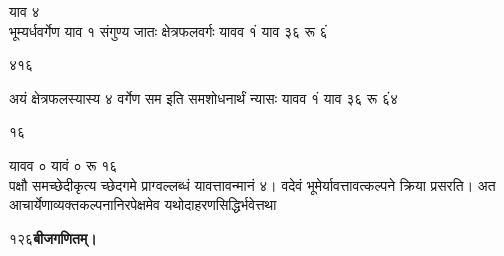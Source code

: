 \documentclass[11pt, openany]{book}
\begin{document}
\begin{sloppypar}
\hspace{2.75in}याव ४\\

\hangindent=0.2in भूम्यर्धवर्गेण याव १ संगुण्य जातः क्षेत्रफलवर्गः यावव १ं याव ३६ रू ६ं

\hspace{1.1in}४\hspace{2.95in}१६

\hangindent=0.2in अयं क्षेत्रफलस्यास्य ४ वर्गेण सम इति समशोधनार्थं न्यासः यावव १ं याव
३६ रू ६ं४

\hspace{4.75in}१६

\hspace{3.75in}यावव ० यावं ० रू १६\\

\hangindent=0.2in पक्षौ समच्छेदीकृत्य च्छेदगमे प्राग्वल्लब्धं यावत्तावन्मानं ४। वदेवं भूमेर्यावत्तावत्कल्पने क्रिया प्रसरति। अत आचार्येणाव्यक्तकल्पनानिरपेक्षमेव यथोदाहरणसिद्धिर्भवेत्तथा
\end{sloppypar}
\thispagestyle{empty}
\newpage

\onehalfspacing
१२६\hspace{2in}\textbf{बीजगणितम्।} 

\vspace{5mm}
\end{document}
